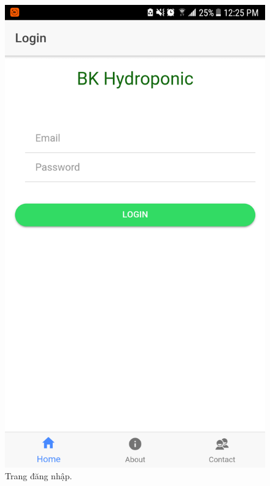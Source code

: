 \documentclass[a4paper,12pt,oneside]{article}
\begin{document}
\begin{figure}[H]
\centering
\includegraphics[scale=.25]{hinh/mobile_login.png}
\caption{Trang đăng nhập.}
\end{figure}
\end{document}
